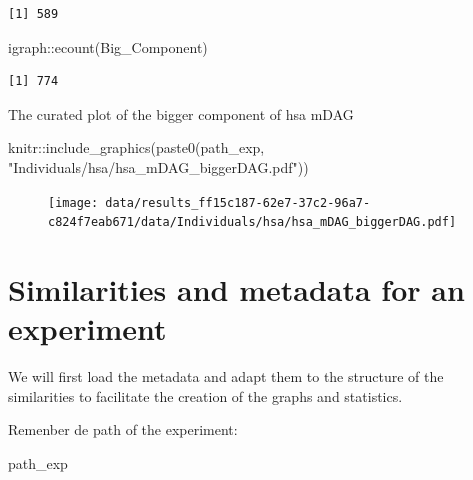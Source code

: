\documentclass[
  letterpaper,
  DIV=11,
  numbers=noendperiod]{scrreprt}
\newenvironment{Shaded}{\begin{snugshade}}{\end{snugshade}}
\newcommand{\FunctionTok}[1]{\textcolor[rgb]{0.28,0.35,0.67}{#1}}
\newcommand{\NormalTok}[1]{\textcolor[rgb]{0.00,0.23,0.31}{#1}}
\newcommand{\SpecialCharTok}[1]{\textcolor[rgb]{0.37,0.37,0.37}{#1}}
\newcommand{\StringTok}[1]{\textcolor[rgb]{0.13,0.47,0.30}{#1}}
\begin{document}
\begin{verbatim}
[1] 589
\end{verbatim}

\begin{Shaded}
\begin{Highlighting}[]
\NormalTok{igraph}\SpecialCharTok{::}\FunctionTok{ecount}\NormalTok{(Big\_Component)}
\end{Highlighting}
\end{Shaded}

\begin{verbatim}
[1] 774
\end{verbatim}

The curated plot of the bigger component of hsa mDAG

\begin{Shaded}
\begin{Highlighting}[]
\NormalTok{knitr}\SpecialCharTok{::}\FunctionTok{include\_graphics}\NormalTok{(}\FunctionTok{paste0}\NormalTok{(path\_exp,}
                               \StringTok{"Individuals/hsa/hsa\_mDAG\_biggerDAG.pdf"}\NormalTok{))}
\end{Highlighting}
\end{Shaded}

\begin{figure}[H]

{\centering \texttt{[image: data/results\_ff15c187-62e7-37c2-96a7-c824f7eab671/data/Individuals/hsa/hsa\_mDAG\_biggerDAG.pdf]}

}

\end{figure}


\hypertarget{similarities-and-metadata-for-an-experiment}{%
\chapter*{Similarities and metadata for an
experiment}\label{similarities-and-metadata-for-an-experiment}}


We will first load the metadata and adapt them to the structure of the
similarities to facilitate the creation of the graphs and statistics.

Remenber de path of the experiment:

\begin{Shaded}
\begin{Highlighting}[]
\NormalTok{path\_exp}
\end{Highlighting}
\end{Shaded}
\end{document}
